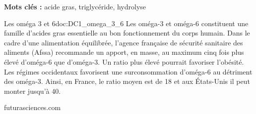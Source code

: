 

\bigskip
{}

\textbf{Mots clés :} acide gras, triglycéride, hydrolyse
\medskip

\begin{doc}{Les oméga 3 et 6}{doc:DC1_omega_3_6}
  Les oméga-3 et oméga-6 constituent une famille d'acides gras essentielle au bon fonctionnement du corps humain.
  Dans le cadre d'une alimentation équilibrée, l'agence française de sécurité sanitaire des aliments (Afssa)
  recommande un apport, en masse, au maximum cinq fois plus élevé d'oméga-6 que d'oméga-3.
  Un ratio plus élevé pourrait favoriser l'obésité.
  Les régimes occidentaux favorisent une surconsommation d'oméga-6 au détriment des oméga-3.
  Ainsi, en France, le ratio moyen est de 18 et aux États-Unis il peut monter jusqu'à 40.

  \begin{flushright}
    futurasciences.com 
  \end{flushright}
\end{doc}

